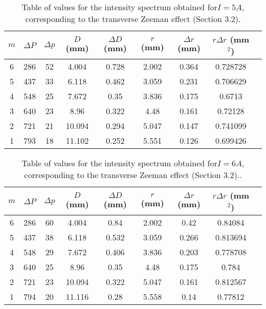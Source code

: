 \documentclass[11pt,twocolumn, a4paper]{article}
\numberwithin{equation}{section} %
\numberwithin{figure}{section} %
\numberwithin{table}{section} %
\begin{document}
\begin{table}[H]
    \centering
    \caption{Table of values for the intensity spectrum obtained for\(I=5A\), corresponding to the transverse Zeeman effect (Section 3.2).}
    \begin{tabular}{c c c c c c c c c}
        \hline
        \(m\) & \(\Delta P\) & \(\Delta p\) & \(D\) (mm) & \(\Delta D\) (mm) & \(r\) (mm) & \(\Delta r\) (mm) & \(r\Delta r\) (mm\(^2\)) \\
        \hline
        6 & 286 & 52 & 4.004 & 0.728 & 2.002 & 0.364 & 0.728728 \\
        5 & 437 & 33 & 6.118 & 0.462 & 3.059 & 0.231 & 0.706629 \\
        4 & 548 & 25 & 7.672 & 0.35  & 3.836 & 0.175 & 0.6713 \\
        3 & 640 & 23 & 8.96  & 0.322 & 4.48  & 0.161 & 0.72128 \\
        2 & 721 & 21 & 10.094 & 0.294 & 5.047 & 0.147 & 0.741099 \\
        1 & 793 & 18 & 11.102 & 0.252 & 5.551 & 0.126 & 0.699426 \\
        \hline
    \end{tabular}
\end{table}


\begin{table}[H]
    \centering
    \caption{Table of values for the intensity spectrum obtained for\(I=6A\), corresponding to the transverse Zeeman effect (Section 3.2)..}
    \begin{tabular}{c c c c c c c c c}
        \hline
        \(m\) & \(\Delta P\) & \(\Delta p\) & \(D\) (mm) & \(\Delta D\) (mm) & \(r\) (mm) & \(\Delta r\) (mm) & \(r\Delta r\) (mm\(^2\)) \\
        \hline
        6 & 286 & 60 & 4.004 & 0.84  & 2.002 & 0.42  & 0.84084 \\
        5 & 437 & 38 & 6.118 & 0.532 & 3.059 & 0.266 & 0.813694 \\
        4 & 548 & 29 & 7.672 & 0.406 & 3.836 & 0.203 & 0.778708 \\
        3 & 640 & 25 & 8.96  & 0.35  & 4.48  & 0.175 & 0.784 \\
        2 & 721 & 23 & 10.094 & 0.322 & 5.047 & 0.161 & 0.812567 \\
        1 & 794 & 20 & 11.116 & 0.28  & 5.558 & 0.14  & 0.77812 \\
        \hline
    \end{tabular}
\end{table}
\end{document}
